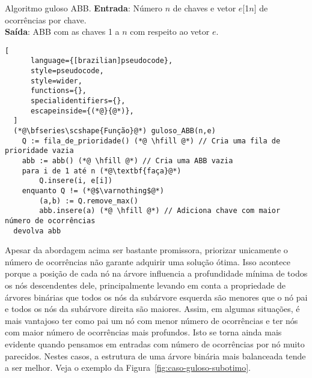 \begin{programruledcaption}{Algoritmo guloso ABB.\label{prog:abb-gulosa}}
  \noindent\textbf{Entrada}: Número $n$ de chaves e vetor $e$[1\tdots$n$] de ocorrências por chave. \\
  \textbf{Saída}: ABB com as chaves 1 a $n$ com respeito ao vetor $e$.
  \vspace{-0.5\baselineskip}
  \begin{lstlisting}[
      language={[brazilian]pseudocode},
      style=pseudocode,
      style=wider,
      functions={},
      specialidentifiers={},
      escapeinside={(*@}{@*)},
  ]
  (*@\bfseries\scshape{Função}@*) guloso_ABB(n,e)
    Q := fila_de_prioridade() (*@ \hfill @*) // Cria uma fila de prioridade vazia
    abb := abb() (*@ \hfill @*) // Cria uma ABB vazia
    para i de 1 até n (*@\textbf{faça}@*)
        Q.insere(i, e[i]) 
    enquanto Q != (*@$\varnothing$@*) 
        (a,b) := Q.remove_max()
        abb.insere(a) (*@ \hfill @*) // Adiciona chave com maior número de ocorrências
  devolva abb
  \end{lstlisting}
  \vspace{-0.5\baselineskip}
\end{programruledcaption}

Apesar da abordagem acima ser bastante promissora, priorizar unicamente o número de ocorrências não garante adquirir uma solução ótima. Isso acontece porque a posição de cada nó na árvore influencia a profundidade mínima de todos os nós descendentes dele, principalmente levando em conta a propriedade de árvores binárias que todos os nós da subárvore esquerda são menores que o nó pai e todos os nós da subárvore direita são maiores. Assim, em algumas situações, é mais vantajoso ter como pai um nó com menor número de ocorrências e ter nós com maior número de ocorrências mais profundos. Isto se torna ainda mais evidente quando pensamos em entradas com número de ocorrências por nó muito parecidos. Nestes casos, a estrutura de uma árvore binária mais balanceada tende a ser melhor. Veja o exemplo da Figura~\ref{fig:caso-guloso-subotimo}.


